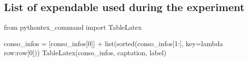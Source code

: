 \subsection{List of expendable used during the experiment}

%
%

\begin{pycode}
from pythontex_command import TableLatex

conso_infos = [conso_infos[0]] + list(sorted(conso_infos[1:], key=lambda row:row[0]))
TableLatex(conso_infos, captation, label)
\end{pycode}